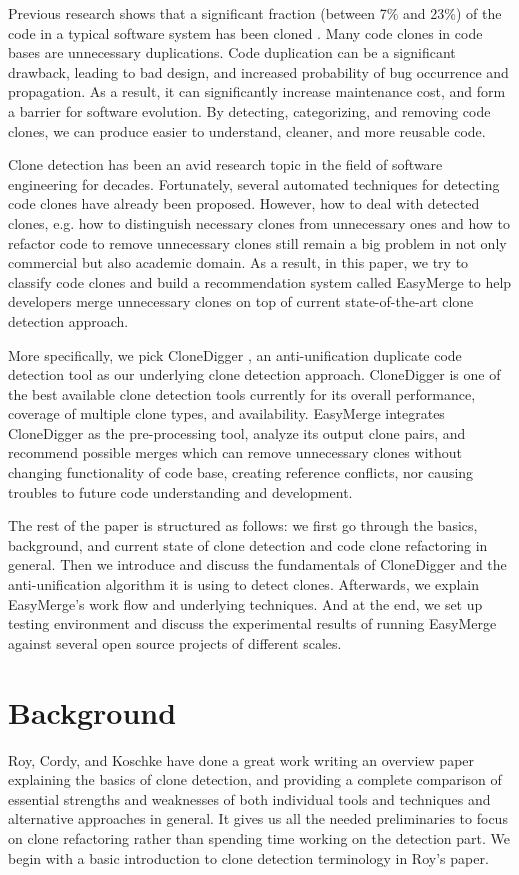 \documentclass{acm_proc_article-sp}
\begin{document}
Previous research shows that a significant fraction (between 7\% and 23\%) of the code in a typical software system has been cloned \cite{baker} \cite{roy1}. Many code clones
in code bases are unnecessary duplications. 
Code duplication can be a significant drawback, leading to bad design, and increased probability of bug occurrence and propagation. As a result, it can significantly
increase maintenance cost, and form a barrier for software evolution. By detecting, categorizing,
and removing code clones, we can produce easier to understand, cleaner, and more reusable code.

Clone detection has been an avid research topic in the field of software engineering for decades. Fortunately, several automated techniques for detecting code clones
have already been proposed. However, how to deal with detected clones, e.g. how to distinguish necessary clones from unnecessary ones and how to refactor code to remove
unnecessary clones still remain a big problem in not only commercial but also academic domain. As a result, in this paper, we try to classify code clones and build
a recommendation system called EasyMerge to help developers merge unnecessary clones on top of current state-of-the-art clone detection approach.

More specifically, we pick CloneDigger \cite{bulychev}, an anti-unification duplicate code detection tool as our underlying clone detection approach. CloneDigger is one of the best available 
clone detection tools currently for its overall performance, coverage of multiple clone types, and availability. 
EasyMerge integrates CloneDigger as the pre-processing tool, analyze its output clone pairs, and recommend possible merges which can remove unnecessary clones without changing functionality of code base, creating reference conflicts, nor causing troubles to future code understanding and development.

The rest of the paper is structured as follows: we first go through the basics, background, and current state of clone detection and code clone refactoring in general.
Then we introduce and discuss the fundamentals of CloneDigger and the anti-unification algorithm it is using to detect clones. Afterwards, we explain EasyMerge's
work flow and underlying techniques. And at the end, we set up testing environment and discuss the experimental results of running EasyMerge against several
open source projects of different scales.

\section{Background}
Roy, Cordy, and Koschke have done a great work \cite{roy2} writing an overview paper explaining the basics of clone detection, and providing a complete comparison of essential
strengths and weaknesses of both individual tools and techniques and alternative approaches in general. It gives us all the needed preliminaries to focus on clone refactoring rather
than spending time working on the detection part. We begin with a basic introduction to clone detection terminology in Roy's paper.
\end{document}
